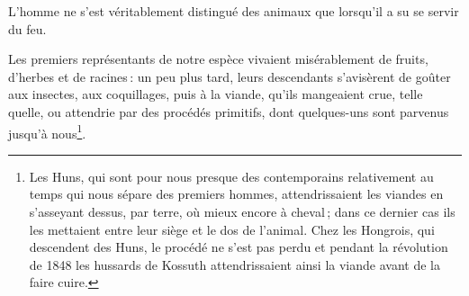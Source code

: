 L'homme ne s'est véritablement distingué des animaux que lorsqu'il a su se
servir du feu.


Les premiers représentants de notre espèce vivaient misérablement de fruits,
d'herbes et de racines : un peu plus tard, leurs descendants s'avisèrent de
goûter aux insectes, aux coquillages, puis à la viande, qu'ils mangeaient crue,
telle quelle, ou attendrie par des procédés primitifs, dont quelques-uns sont
parvenus jusqu'à nous\footnote{Les Huns, qui sont pour nous presque des
contemporains relativement au temps qui nous sépare des premiers hommes,
attendrissaient les viandes en s'asseyant dessus, par terre, où mieux encore
à cheval ; dans ce dernier cas ils les mettaient entre leur siège et le dos de
l'animal. Chez les Hongrois, qui descendent des Huns, le procédé ne s'est pas
perdu et pendant la révolution de 1848 les hussards de Kossuth attendrissaient
ainsi la viande avant de la faire cuire.}.

